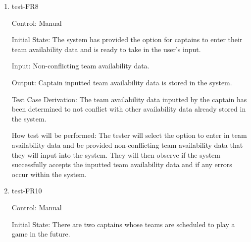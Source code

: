 \documentclass[12pt, titlepage]{article}
\begin{document}
\begin{enumerate}

  \item{test-FR8\\}

  Control: Manual

  Initial State: The system has provided the option for captains to enter their team
  availability data and is ready to take in the user's input.

  Input: Non-conflicting team availability data.

  Output: Captain inputted team availability data is stored in the system.

  Test Case Derivation: The team availability data inputted by the captain has been
  determined to not conflict with other availability data already stored in the system.

  How test will be performed: The tester will select the option to enter in team 
  availability data and be provided non-conflicting team availability
  data that they will input into the system. They will then observe if the system successfully
  accepts the inputted team availability data and if any errors occur within the system.








  \item{test-FR10\\}

  Control: Manual

  Initial State: There are two captains whose teams are scheduled to play a
  game in the future.


\end{enumerate}
\end{document}
